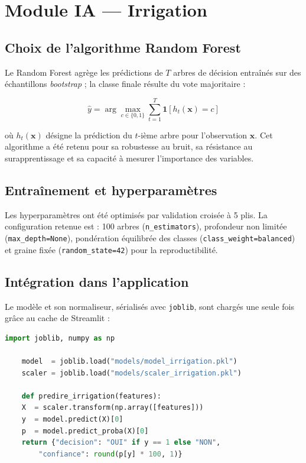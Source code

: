 \section{Module IA --- Irrigation}
\label{sec:module_irrigation}

\subsection{Choix de l'algorithme Random Forest}

Le Random Forest \cite{breiman2001random} agrège les prédictions
de $T$ arbres de décision entraînés sur des échantillons
\textit{bootstrap} ; la classe finale résulte du vote
majoritaire :

\begin{equation}
	\hat{y} = \arg\max_{c \in \{0,1\}} \sum_{t=1}^{T}
	\mathbf{1}\left[ h_t(\mathbf{x}) = c \right]
	\label{eq:rf}
\end{equation}

où $h_t(\mathbf{x})$ désigne la prédiction du $t$-ième arbre
pour l'observation $\mathbf{x}$. Cet algorithme a été retenu
pour sa robustesse au bruit, sa résistance au surapprentissage
et sa capacité à mesurer l'importance des variables.

\subsection{Entraînement et hyperparamètres}

Les hyperparamètres ont été optimisés par validation croisée à 5
plis. La configuration retenue est : 100 arbres
(\texttt{n\_estimators}), profondeur non limitée
(\texttt{max\_depth=None}), pondération équilibrée des classes
(\texttt{class\_weight=balanced}) et graine fixée
(\texttt{random\_state=42}) pour la reproductibilité.

\subsection{Intégration dans l'application}

Le modèle et son normaliseur, sérialisés avec \texttt{joblib},
sont chargés une seule fois grâce au cache de Streamlit :

\begin{lstlisting}[language=Python,
	caption={Chargement et prédiction du module Irrigation},
	label={lst:pred_irr}]
	import joblib, numpy as np
	
	model  = joblib.load("models/model_irrigation.pkl")
	scaler = joblib.load("models/scaler_irrigation.pkl")
	
	def predire_irrigation(features):
	X  = scaler.transform(np.array([features]))
	y  = model.predict(X)[0]
	p  = model.predict_proba(X)[0]
	return {"decision": "OUI" if y == 1 else "NON",
		"confiance": round(p[y] * 100, 1)}
\end{lstlisting}

